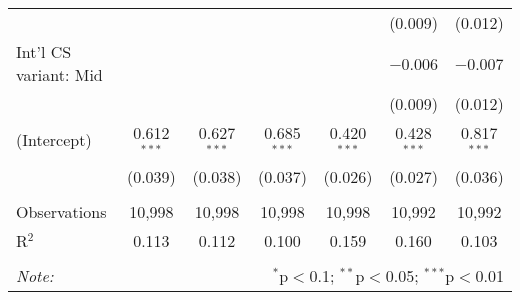 \begin{tabular}{@{\extracolsep{5pt}}lcccccc}
  &  &  &  &  & (0.009) & (0.012) \\ 
  Int'l CS variant: Mid &  &  &  &  & $-$0.006 & $-$0.007 \\ 
  &  &  &  &  & (0.009) & (0.012) \\ 
  (Intercept) & 0.612$^{***}$ & 0.627$^{***}$ & 0.685$^{***}$ & 0.420$^{***}$ & 0.428$^{***}$ & 0.817$^{***}$ \\ 
  & (0.039) & (0.038) & (0.037) & (0.026) & (0.027) & (0.036) \\ 
 \hline \\[-1.8ex] 
Observations & 10,998 & 10,998 & 10,998 & 10,998 & 10,992 & 10,992 \\ 
R$^{2}$ & 0.113 & 0.112 & 0.100 & 0.159 & 0.160 & 0.103 \\ 
\hline 
\hline \\[-1.8ex] 
\textit{Note:}  & \multicolumn{6}{r}{$^{*}$p$<$0.1; $^{**}$p$<$0.05; $^{***}$p$<$0.01} \\ 
\end{tabular} 
